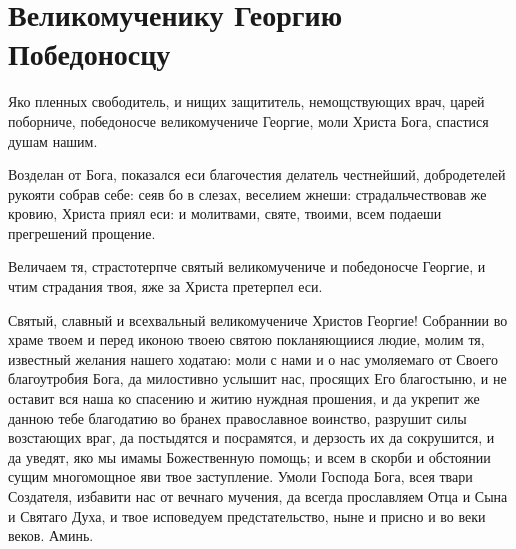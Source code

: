 \mychapterending





\section{Великомученику Георгию Победоносцу}\begin{mymulticols}




Яко пленных свободитель, и нищих защититель, немощствующих врач, царей поборниче, победоносче великомучениче Георгие, моли Христа Бога, спастися душам нашим.




Возделан от Бога, показался еси благочестия делатель честнейший, добродетелей рукояти собрав себе: сеяв бо в слезах, веселием жнеши: страдальчествовав же кровию, Христа приял еси: и молитвами, святе, твоими, всем подаеши прегрешений прощение.




Величаем тя, страстотерпче святый великомучениче и победоносче Георгие, и чтим страдания твоя, яже за Христа претерпел еси.



Святый, славный и всехвальный великомучениче Христов Георгие! Собраннии во храме твоем и перед иконою твоею святою покланяющиися людие, молим тя, известный желания нашего ходатаю: моли с нами и о нас умоляемаго от Своего благоутробия Бога, да милостивно услышит нас, просящих Его благостыню, и не оставит вся наша ко спасению и житию нуждная прошения, и да укрепит же данною тебе благодатию во бранех православное воинство, разрушит силы возстающих враг, да постыдятся и посрамятся, и дерзость их да сокрушится, и да уведят, яко мы имамы Божественную помощь; и всем в скорби и обстоянии сущим многомощное яви твое заступление. Умоли Господа Бога, всея твари Создателя, избавити нас от вечнаго мучения, да всегда прославляем Отца и Сына и Святаго Духа, и твое исповедуем предстательство, ныне и присно и во веки веков. Аминь.

\end{mymulticols}

\mychapterending





